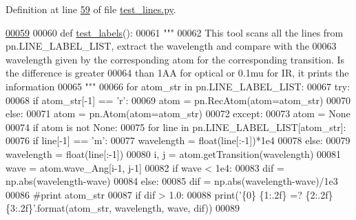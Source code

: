 Definition at line \hyperlink{test__lines_8py_source_l00059}{59} of file \hyperlink{test__lines_8py_source}{test\-\_\-lines.\-py}.


\begin{DoxyCode}
\hypertarget{namespacepyneb_1_1test_1_1test__lines_l00059}{}\hyperlink{namespacepyneb_1_1test_1_1test__lines_ad390fada703f6ef17a79073dc89b4bfb}{00059} 
00060 \textcolor{keyword}{def }\hyperlink{namespacepyneb_1_1test_1_1test__lines_ad390fada703f6ef17a79073dc89b4bfb}{test\_labels}():
00061     \textcolor{stringliteral}{"""}
00062 \textcolor{stringliteral}{    This tool scans all the lines from pn.LINE\_LABEL\_LIST, extract the wavelength and compare with the }
00063 \textcolor{stringliteral}{    wavelength given by the corresponding atom for the corresponding transition. Is the difference is
       greater }
00064 \textcolor{stringliteral}{    than 1AA for optical or 0.1mu for IR, it prints the information}
00065 \textcolor{stringliteral}{    """}
00066     \textcolor{keywordflow}{for} atom\_str \textcolor{keywordflow}{in} pn.LINE\_LABEL\_LIST:
00067         \textcolor{keywordflow}{try}:
00068             \textcolor{keywordflow}{if} atom\_str[-1] == \textcolor{stringliteral}{'}\textcolor{stringliteral}{r':}
00069 \textcolor{stringliteral}{                atom = pn.RecAtom(atom=atom\_str)}
00070 \textcolor{stringliteral}{            }\textcolor{keywordflow}{else}:
00071                 atom = pn.Atom(atom=atom\_str)
00072         \textcolor{keywordflow}{except}:
00073             atom = \textcolor{keywordtype}{None}
00074         \textcolor{keywordflow}{if} atom \textcolor{keywordflow}{is} \textcolor{keywordflow}{not} \textcolor{keywordtype}{None}:
00075             \textcolor{keywordflow}{for} line \textcolor{keywordflow}{in} pn.LINE\_LABEL\_LIST[atom\_str]:
00076                 \textcolor{keywordflow}{if} line[-1] == \textcolor{stringliteral}{'m'}:
00077                     wavelength = float(line[:-1])*1e4
00078                 \textcolor{keywordflow}{else}:
00079                     wavelength = float(line[:-1])
00080                 i, j = atom.getTransition(wavelength)
00081                 wave = atom.wave\_Ang[i-1, j-1]
00082                 \textcolor{keywordflow}{if} wave < 1e4:
00083                     dif = np.abs(wavelength-wave)
00084                 \textcolor{keywordflow}{else}:
00085                     dif = np.abs(wavelength-wave)/1e3
00086                 \textcolor{comment}{#print atom\_str}
00087                 \textcolor{keywordflow}{if} dif > 1.0:
00088                     print(\textcolor{stringliteral}{'\{0\} \{1:.2f\} =? \{2:.2f\}  \{3:.2f\}'}.format(atom\_str, wavelength, wave, dif))
00089                     

\end{DoxyCode}

